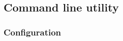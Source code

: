 \subsection{Command line utility}\label{sec:command-line-utility}

\subsubsection{Configuration}\label{sec:producer-configuration}
